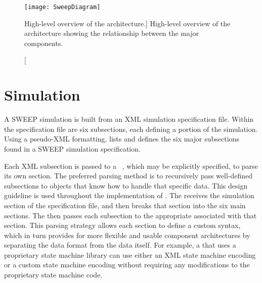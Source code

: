 \begin{figure}[ht]
  \centering
  \begin{minipage}{.9\linewidth}
    \texttt{[image: SweepDiagram]}
	\caption
		[High-level overview of the \SWEEP{} architecture.]
		{High-level overview of the \SWEEP{} architecture showing the relationship between the major components.}
  \end{minipage}
\label{fig:SweepDiagram}
\end{figure}

\section{Simulation}
A SWEEP simulation is built from an XML simulation specification file. Within the specification file are six subsections, each defining a portion of the simulation. Using a pseudo-XML formatting,  lists and defines the six major subsections found in a SWEEP simulation specification.

Each XML subsection is passed to a ~\cite{GoF}, which may be explicitly specified, to parse its own section. The preferred parsing method is to recursively pass well-defined subsections to  objects that know how to handle that specific data. This design guideline is used throughout the implementation of \SWEEP{}. The  receives the simulation section of the specification file, and then breaks that section into the six main sections. The  then passes each subsection to the appropriate  associated with that section. This parsing strategy allows each section to define a custom syntax, which in turn provides for more flexible and usable component architectures by separating the data format from the data itself. For example, a  that uses a proprietary state machine library can use either an XML state machine encoding or a custom state machine encoding without requiring any modifications to the proprietary state machine code.

